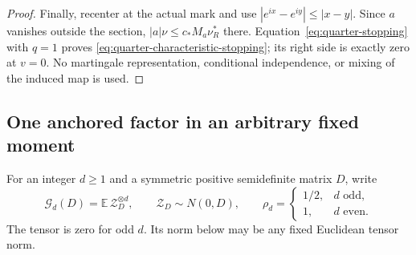 \begin{proof}
Finally, recenter at the actual mark and use
$|e^{ix}-e^{iy}|\le|x-y|$. Since $a$ vanishes outside the section,
$|a|\nu\le c_*M_a\nu_R^*$ there. Equation~\eqref{eq:quarter-stopping}
with $q=1$ proves \eqref{eq:quarter-characteristic-stopping}; its right
side is exactly zero at $v=0$. No martingale representation, conditional
independence, or mixing of the induced map is used.
\end{proof}

\subsection{One anchored factor in an arbitrary fixed moment}
For an integer $d\ge1$ and a symmetric positive semidefinite matrix
$D$, write
\[
 \mathcal G_d(D)=\mathbb E\,\mathcal Z_D^{\otimes d},\qquad
 \mathcal Z_D\sim N(0,D),\qquad
 \rho_d=\begin{cases}1/2,&d\text{ odd},\\1,&d\text{ even}.\end{cases}
\]
The tensor is zero for odd $d$. Its norm below may be any fixed
Euclidean tensor norm.


